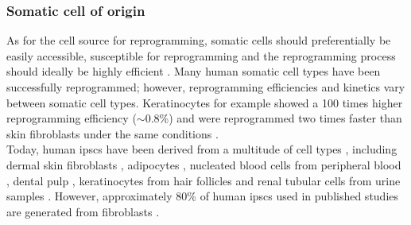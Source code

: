 

\subsubsection{Somatic cell of origin}

As for the cell source for reprogramming, somatic cells should preferentially be easily accessible, susceptible for reprogramming and the reprogramming process should ideally be highly efficient \cite{brouwer2016choices}. 
Many human somatic cell types have been successfully reprogrammed; however, reprogramming efficiencies and kinetics vary between somatic cell types. 
Keratinocytes for example showed a 100 times higher reprogramming efficiency ($\sim$0.8\%) and were reprogrammed two times faster than skin fibroblasts under the same conditions \cite{aasen2008efficient}. \\

Today, human \glspl{ipsc} have been derived from a multitude of cell types \cite{doss2019current}, including dermal skin fibroblasts \cite{takahashi2007induction, yu2007induced}, adipocytes \cite{sugii2010human}, nucleated blood cells from peripheral blood \cite{loh2009generation, seki2010generation}, dental pulp \cite{yan2010ips},
keratinocytes from hair follicles \cite{aasen2008efficient} and
renal tubular cells from urine samples \cite{cao2018generation}.
However, approximately 80\% of human \glspl{ipsc} used in published studies are generated from fibroblasts \cite{takahashi2016decade}. \\

